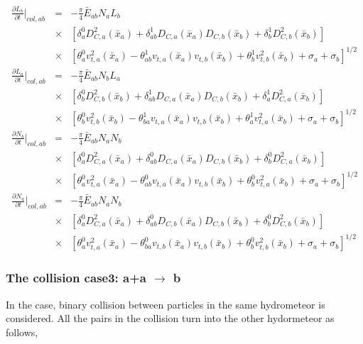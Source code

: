 \begin{eqnarray}
\frac{\partial L_{b}}{\partial t}\Bigr|_{col,ab}&=&-\frac{\pi}{4}\bar{E}_{ab}{N_{a}}{L_{b}}\nonumber\\
&\times&[\delta_{a}^{0}D_{C,a}^{2}(\bar{x}_{a})+\delta_{ab}^{1}D_{C,a}(\bar{x}_{a})D_{C,b}(\bar{x}_{b})+\delta_{b}^{1}D_{C,b}^{2}(\bar{x}_{b})]\label{sn195}\\
&\times&[\theta_{a}^{0}v_{t,a}^{2}(\bar{x}_{a})-\theta_{ab}^{1}v_{t,a}(\bar{x}_{a})v_{t,b}(\bar{x}_{b})+\theta_{b}^{1}v_{t,b}^{2}(\bar{x}_{b})+\sigma_{a}+\sigma_{b}]^{1/2}\nonumber\\
\frac{\partial L_{a}}{\partial t}\Bigr|_{col,ab}&=&-\frac{\pi}{4}\bar{E}_{ab}{N_{b}}{L_{a}}\nonumber\\
&\times&[\delta_{b}^{0}D_{C,b}^{2}(\bar{x}_{b})+\delta_{ab}^{1}D_{C,a}(\bar{x}_{a})D_{C,b}(\bar{x}_{b})+\delta_{a}^{1}D_{C,a}^{2}(\bar{x}_{b})]\label{sn196}\\
&\times&[\theta_{b}^{0}v_{t,b}^{2}(\bar{x}_{b})-\theta_{ba}^{1}v_{t,a}(\bar{x}_{a})v_{t,b}(\bar{x}_{b})+\theta_{a}^{1}v_{t,a}^{2}(\bar{x}_{b})+\sigma_{a}+\sigma_{b}]^{1/2}\nonumber\\
\frac{\partial N_{b}}{\partial t}\Bigr|_{col,ab}&=&-\frac{\pi}{4}\bar{E}_{ab}{N_{a}}{N_{b}}\nonumber\\
&\times&[\delta_{a}^{0}D_{C,a}^{2}(\bar{x}_{a})+\delta_{ab}^{0}D_{C,a}(\bar{x}_{a})D_{C,b}(\bar{x}_{b})+\delta_{b}^{0}D_{C,a}^{2}(\bar{x}_{b})]\label{sn197}\\
&\times&[\theta_{a}^{0}v_{t,a}^{2}(\bar{x}_{a})-\theta_{ab}^{0}v_{t,a}(\bar{x}_{a})v_{t,b}(\bar{x}_{b})+\theta_{b}^{0}v_{t,a}^{2}(\bar{x}_{b})+\sigma_{a}+\sigma_{b}]^{1/2}\nonumber\\
\frac{\partial N_{a}}{\partial t}\Bigr|_{col,ab}&=&-\frac{\pi}{4}\bar{E}_{ab}{N_{a}}{N_{b}}\nonumber\\
&\times&[\delta_{a}^{0}D_{C,a}^{2}(\bar{x}_{a})+\delta_{ab}^{0}D_{C,b}(\bar{x}_{a})D_{C,b}(\bar{x}_{b})+\delta_{b}^{0}D_{C,b}^{2}(\bar{x}_{b})]\label{sn198}\\
&\times&[\theta_{a}^{0}v_{t,a}^{2}(\bar{x}_{a})-\theta_{ba}^{0}v_{t,b}(\bar{x}_{a})v_{t,b}(\bar{x}_{b})+\theta_{b}^{0}v_{t,b}^{2}(\bar{x}_{b})+\sigma_{a}+\sigma_{b}]^{1/2}\nonumber
\end{eqnarray}

\subsubsection{The collision case3: a+a $\rightarrow$ b}
In the case, binary collision between particles in the same hydrometeor is considered. All the pairs in the collision turn into the other hydormeteor as follows,

